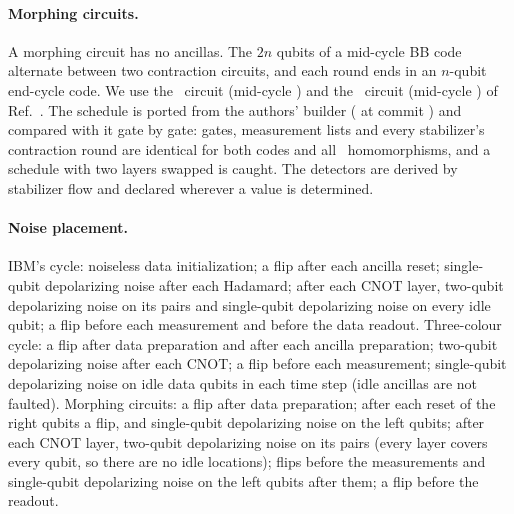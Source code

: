 \documentclass[aps,pra,twocolumn,superscriptaddress,nofootinbib,longbibliography,floatfix]{revtex4-2}
\begin{document}
\paragraph*{Morphing circuits.} A morphing circuit has no ancillas. The $2n$ qubits of a mid-cycle BB code alternate between two contraction circuits, and each round ends in an $n$-qubit end-cycle code. We use the \SmallCode\ circuit (mid-cycle \GrossCode) and the \GrossCode\ circuit (mid-cycle \BigMidCode) of Ref.~\cite{shaw2024lowering}. The schedule is ported from the authors' builder (\texttt{\MorphRepo} at commit \texttt{\MorphCommit}) and compared with it gate by gate: gates, measurement lists and every stabilizer's contraction round are identical for both codes and all \MorphHoms\ homomorphisms, and a schedule with two layers swapped is caught. The detectors are derived by stabilizer flow and declared wherever a value is determined.

\paragraph*{Noise placement.} IBM's cycle: noiseless data initialization; a flip after each ancilla reset; single-qubit depolarizing noise after each Hadamard; after each CNOT layer, two-qubit depolarizing noise on its pairs and single-qubit depolarizing noise on every idle qubit; a flip before each measurement and before the data readout. Three-colour cycle: a flip after data preparation and after each ancilla preparation; two-qubit depolarizing noise after each CNOT; a flip before each measurement; single-qubit depolarizing noise on idle data qubits in each time step (idle ancillas are not faulted). Morphing circuits: a flip after data preparation; after each reset of the right qubits a flip, and single-qubit depolarizing noise on the left qubits; after each CNOT layer, two-qubit depolarizing noise on its pairs (every layer covers every qubit, so there are no idle locations); flips before the measurements and single-qubit depolarizing noise on the left qubits after them; a flip before the readout.
\end{document}
